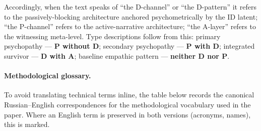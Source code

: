 Accordingly, when the text speaks of ``the D-channel'' or ``the D-pattern'' it refers to the passively-blocking architecture anchored psychometrically by the ID latent; ``the P-channel'' refers to the active-narrative architecture; ``the A-layer'' refers to the witnessing meta-level. Type descriptions follow from this: primary psychopathy --- \textbf{P without D}; secondary psychopathy --- \textbf{P with D}; integrated survivor --- \textbf{D with A}; baseline empathic pattern --- \textbf{neither D nor P}.

\paragraph{Methodological glossary.} To avoid translating technical terms inline, the table below records the canonical Russian--English correspondences for the methodological vocabulary used in the paper. Where an English term is preserved in both versions (acronyms, names), this is marked.

